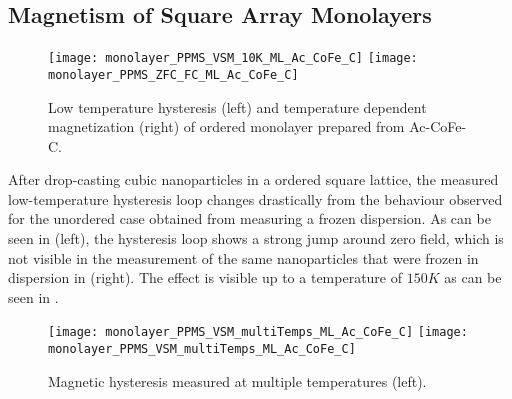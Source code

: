 \documentclass[\main/dresen_thesis.tex]{subfiles}
\renewcommand{\thisPath}{\main/chapters/monolayers/magneticStructure}
\begin{document}
  \subsection{Magnetism of Square Array Monolayers}
  \begin{figure}[tb]
    \centering
    \texttt{[image: monolayer\_PPMS\_VSM\_10K\_ML\_Ac\_CoFe\_C]}
    \texttt{[image: monolayer\_PPMS\_ZFC\_FC\_ML\_Ac\_CoFe\_C]}
    \caption{\label{fig:monolayer:magneticStructure:ppms}Low temperature hysteresis (left) and temperature dependent magnetization (right) of ordered monolayer prepared from Ac-CoFe-C.}
  \end{figure}
  After drop-casting cubic nanoparticles in a ordered square lattice, the measured low-temperature hysteresis loop changes drastically from the behaviour observed for the unordered case obtained from measuring a frozen dispersion.
  As can be seen in  (left), the hysteresis loop shows a strong jump around zero field, which is not visible in the measurement of the same nanoparticles that were frozen in dispersion in  (right).
  The effect is visible up to a temperature of $150 \unit{K}$ as can be seen in .
  \begin{figure}[tb]
    \centering
    \texttt{[image: monolayer\_PPMS\_VSM\_multiTemps\_ML\_Ac\_CoFe\_C]}
    \texttt{[image: monolayer\_PPMS\_VSM\_multiTemps\_ML\_Ac\_CoFe\_C]}
    \caption{\label{fig:monolayer:magneticStructure:ppms}Magnetic hysteresis measured at multiple temperatures (left).}
  \end{figure}
  




\end{document}
